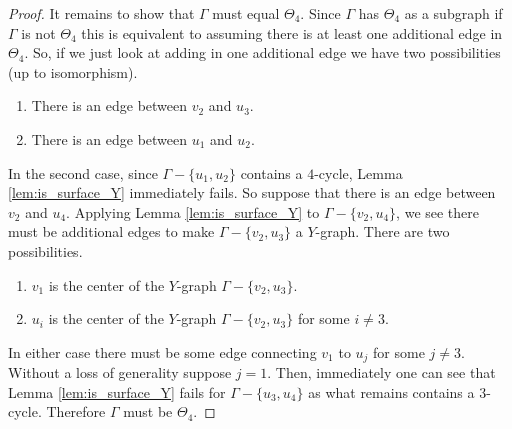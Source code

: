 \begin{proof}
    It remains to show that \(\Gamma\) must equal \(\Theta_4\). Since \(\Gamma\) has \(\Theta_4\) as a subgraph
    if \(\Gamma\) is not \(\Theta_4\) this is equivalent to assuming there is at least one additional edge in \(\Theta_4\).
    So, if we just look at adding in one additional edge we have two possibilities (up to isomorphism).
    \begin{enumerate}
        \item There is an edge between \(v_2\) and \(u_3\).
        \item There is an edge between \(u_1\) and \(u_2\).
    \end{enumerate}
    In the second case, since \(\Gamma - \{u_1, u_2\}\) contains a \(4\)-cycle, Lemma \ref{lem:is_surface_Y} immediately fails.
    So suppose that there is an edge between \(v_2\) and \(u_4\).
    Applying Lemma \ref{lem:is_surface_Y} to \(\Gamma - \{v_2, u_4\}\), we see there must be additional edges to make \(\Gamma - \{v_2, u_3\}\)
    a \(Y\)-graph.
    There are two possibilities.
    \begin{enumerate}
        \item \(v_1\) is the center of the \(Y\)-graph \(\Gamma - \{v_2, u_3\}\).
        \item \(u_i\) is the center of the \(Y\)-graph \(\Gamma - \{v_2, u_3\}\) for some \(i \neq 3\).
    \end{enumerate}
    In either case there must be some edge connecting \(v_1\) to \(u_j\) for some \(j \neq 3\).
    Without a loss of generality suppose \(j = 1\).
    Then, immediately one can see that Lemma \ref{lem:is_surface_Y} fails for \(\Gamma - \{u_3, u_4\}\)
    as what remains contains a \(3\)-cycle.
    Therefore \(\Gamma\) must be \(\Theta_4\).
\end{proof}


